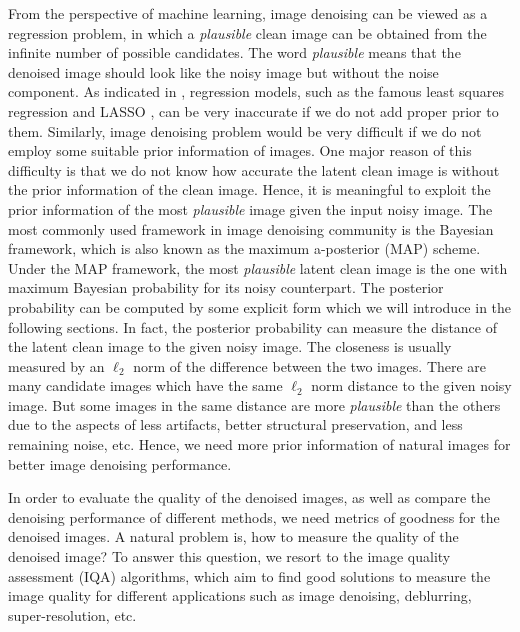 From the perspective of machine learning, image denoising can be viewed as a regression problem, in which a \textsl{plausible} clean image can be obtained from the infinite number of possible candidates. The word \textsl{plausible} means that the denoised image should look like the noisy image but without the noise component. As indicated in \cite{Bishop}, regression models, such as the famous least squares regression and LASSO \cite{lasso}, can be very inaccurate if we do not add proper prior to them. Similarly, image denoising problem would be very difficult if we do not employ some suitable prior information of images. One major reason of this difficulty is that we do not know how accurate the latent clean image is without the prior information of the clean image. Hence, it is meaningful to exploit the prior information of the most \textsl{plausible} image given the input noisy image. The most commonly used framework in image denoising community is the Bayesian framework, which is also known as the maximum a-posterior (MAP) scheme. Under the MAP framework, the most \textsl{plausible} latent clean image is the one with maximum Bayesian probability for its noisy counterpart. The posterior probability can be computed by some explicit form which we will introduce in the following sections. In fact, the posterior probability can measure the distance of the latent clean image to the given noisy image. The closeness is usually measured by an $\ell_{2}$ norm of the difference between the two images. There are many candidate images which have the same $\ell_{2}$ norm distance to the given noisy image. But some images in the same distance are more \textsl{plausible} than the others due to the aspects of less artifacts, better structural preservation, and less remaining noise, etc. Hence, we need more prior information of natural images for better image denoising performance.


In order to evaluate the quality of the denoised images, as well as compare the denoising performance of different methods, we need metrics of goodness for the denoised images. A natural problem is, how to measure the quality of the denoised image? To answer this question, we resort to the image quality assessment (IQA) algorithms, which aim to find good solutions to measure the image quality for different applications such as image denoising, deblurring, super-resolution, etc. 


